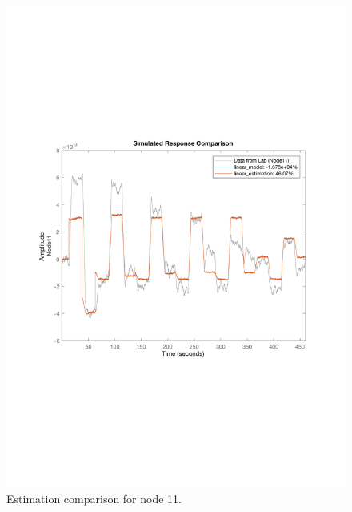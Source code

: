 \begin{figure}[H]
\begin{minipage}[b]{0.45\textwidth}
    \includegraphics[width=\textwidth]{report/pictures/Node11_estimation.pdf}
    \caption{Estimation comparison for node 11.}
  \end{minipage}
\end{figure}

